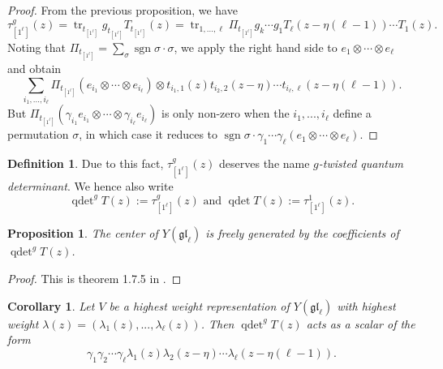 \documentclass[11pt]{report}
\newtheorem{prop}[theorem]{Proposition}
\newtheorem{corollary}[theorem]{Corollary}
\theoremstyle{definition}
\newtheorem{definition}[theorem]{Definition}
\theoremstyle{remark}
\theoremstyle{remark}
\begin{document}
\begin{proof}
From the previous proposition, we have
\begin{equation*}
\tau_{[1^\ell]}^g(z) = \operatorname{tr}_{t_{[1^\ell]}} g_{t_{[1^\ell]}} T_{t_{[1^\ell]}}(z) = \operatorname{tr}_{1,...,\ell} \Pi_{t_{[1^\ell]}} g_k \cdots g_1 T_\ell(z-\eta(\ell-1)) \cdots T_1(z).
\end{equation*}
Noting that $\Pi_{t_{[1^\ell]}} = \sum_\sigma \operatorname{sgn} \sigma \cdot \sigma$, we apply the right hand side to $e_1 \otimes \cdots \otimes e_\ell$ and obtain
\begin{equation*}
\sum_{i_1,...,i_\ell} \Pi_{t_{[1^\ell]}} (e_{i_1} \otimes \cdots \otimes e_{i_\ell}) \otimes t_{i_1,1}(z) t_{i_2,2}(z-\eta) \cdots t_{i_\ell,\ell}(z-\eta(\ell-1)).
\end{equation*}
But $\Pi_{t_{[1^\ell]}} (\gamma_{i_1} e_{i_1} \otimes \cdots \otimes \gamma_{i_\ell} e_{i_\ell})$ is only non-zero when the $i_1,...,i_\ell$ define a permutation $\sigma$, in which case it reduces to $\operatorname{sgn} \sigma \cdot \gamma_1 \cdots \gamma_\ell (e_1 \otimes \cdots \otimes e_\ell)$.
\end{proof}

\begin{definition}
Due to this fact, $\tau_{[1^\ell]}^g(z)$ deserves the name \emph{$g$-twisted quantum determinant}. We hence also write 
\begin{equation*}
\operatorname{qdet}^g T(z) := \tau_{[1^\ell]}^g(z) \text{ and } \operatorname{qdet} T(z) := \tau_{[1^\ell]}^1(z).
\end{equation*}
\end{definition}

\begin{prop}
The center of $Y(\mathfrak{gl}_\ell)$ is freely generated by the coefficients of $\operatorname{qdet}^g T(z)$.
\end{prop}

\begin{proof}
This is theorem 1.7.5 in \cite{book:molev}.
\end{proof}

\begin{corollary}\label{corollary:quantumDet}
Let $V$ be a highest weight representation of $Y(\mathfrak{gl}_\ell)$ with highest weight $\lambda(z) = (\lambda_1(z),...,\lambda_\ell(z))$. Then $\operatorname{qdet}^g T(z)$ acts as a scalar of the form
\begin{equation*}
\gamma_1 \gamma_2 \cdots \gamma_\ell \lambda_1(z) \lambda_2(z-\eta) \cdots \lambda_\ell(z-\eta(\ell-1)).
\end{equation*}
\end{corollary}
\end{document}
